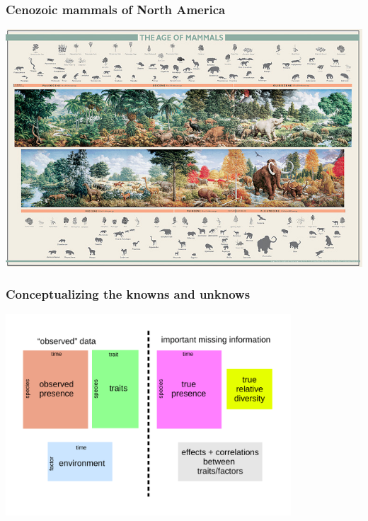 \documentclass[aspectratio=169]{beamer}
\begin{document}
\begin{frame}
  \frametitle{Cenozoic mammals of North America}
  \begin{center}
    \includegraphics[height=0.775\textheight,width=\textwidth,keepaspectratio=true]{figure/aom}
  \end{center}

  \tiny{}
\end{frame}


\begin{frame}
  \frametitle{Conceptualizing the knowns and unknows}
  \begin{center}
    \includegraphics[width=0.8\textwidth,height=\textheight,keepaspectratio=true]{figure/problem_concept}
  \end{center}
\end{frame}
\end{document}
